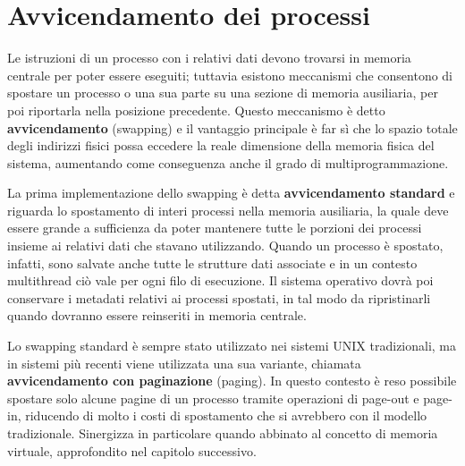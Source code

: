 %

\section{Avvicendamento dei processi}
Le istruzioni di un processo con i relativi dati devono trovarsi in memoria centrale per poter essere eseguiti; tuttavia esistono meccanismi che
consentono di spostare un processo o una sua parte su una sezione di memoria ausiliaria, per poi riportarla nella posizione precedente. Questo
meccanismo è detto \textbf{avvicendamento} (swapping) e il vantaggio principale è far sì che lo spazio totale degli indirizzi fisici possa eccedere
la reale dimensione della memoria fisica del sistema, aumentando come conseguenza anche il grado di multiprogrammazione.\par
La prima implementazione dello swapping è detta \textbf{avvicendamento standard} e riguarda lo spostamento di interi processi nella memoria ausiliaria,
la quale deve essere grande a sufficienza da poter mantenere tutte le porzioni dei processi insieme ai relativi dati che stavano utilizzando. Quando un
processo è spostato, infatti, sono salvate anche tutte le strutture dati associate e in un contesto multithread ciò vale per ogni filo di esecuzione.
Il sistema operativo dovrà poi conservare i metadati relativi ai processi spostati, in tal modo da ripristinarli quando dovranno essere reinseriti in
memoria centrale.\par
Lo swapping standard è sempre stato utilizzato nei sistemi UNIX tradizionali, ma in sistemi più recenti viene utilizzata una sua variante, chiamata
\textbf{avvicendamento con paginazione} (paging). In questo contesto è reso possibile spostare solo alcune pagine di un processo tramite operazioni di
page-out e page-in, riducendo di molto i costi di spostamento che si avrebbero con il modello tradizionale. Sinergizza in particolare quando abbinato
al concetto di memoria virtuale, approfondito nel capitolo successivo.